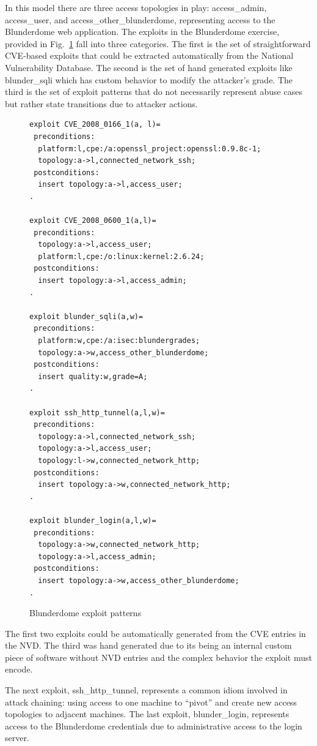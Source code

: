In this model there are three access topologies in play: access\_admin,
access\_user, and access\_other\_blunderdome, representing access to the 
Blunderdome web application.
The exploits in the Blunderdome exercise, provided in Fig.~\ref{fig:blunder_xp}
fall into three categories. The first is the set of straightforward CVE-based exploits
that could be extracted automatically from the National Vulnerability
Database. The second is the set of hand generated exploits like blunder\_sqli
which has custom behavior to modify the attacker's grade. The third is the set
of exploit patterns that do not necessarily represent abuse cases 
but rather state transitions due to attacker actions.

\begin{figure}
\begin{lstlisting}
exploit CVE_2008_0166_1(a, l)=
 preconditions:
  platform:l,cpe:/a:openssl_project:openssl:0.9.8c-1;
  topology:a->l,connected_network_ssh;
 postconditions:
  insert topology:a->l,access_user;
.

exploit CVE_2008_0600_1(a,l)=
 preconditions:
  topology:a->l,access_user;
  platform:l,cpe:/o:linux:kernel:2.6.24;
 postconditions:
  insert topology:a->l,access_admin;
.

exploit blunder_sqli(a,w)=
 preconditions:
  platform:w,cpe:/a:isec:blundergrades;
  topology:a->w,access_other_blunderdome;
 postconditions:
  insert quality:w,grade=A;
.

exploit ssh_http_tunnel(a,l,w)=
 preconditions:
  topology:a->l,connected_network_ssh;
  topology:a->l,access_user;
  topology:l->w,connected_network_http;
 postconditions:
  insert topology:a->w,connected_network_http;
.

exploit blunder_login(a,l,w)=
 preconditions:
  topology:a->w,connected_network_http;
  topology:a->l,access_admin;
 postconditions:
  insert topology:a->w,access_other_blunderdome;
.
\end{lstlisting}
\caption{Blunderdome exploit patterns}
\label{fig:blunder_xp}
\end{figure}

The first two exploits could be automatically generated from the CVE entries
in the NVD. The third was hand generated due to its being an internal custom 
piece of software without NVD entries and the complex behavior the exploit must
encode.

The next exploit, ssh\_http\_tunnel, represents a common idiom involved in
attack chaining: using access to one machine to ``pivot'' and create new access topologies
to adjacent machines. The last exploit, blunder\_login, represents access to
the Blunderdome credentials due to administrative access to the login
server.

